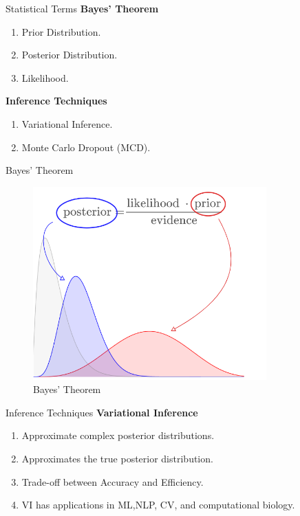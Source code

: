 \documentclass[aspectratio=169,xcolor=dvipsnames, t]{beamer}
\begin{document}
\begin{frame}{Statistical Terms}
    \textbf{Bayes' Theorem}
    \begin{enumerate}
        \item Prior Distribution.
        \item Posterior Distribution.
        \item Likelihood.
    \end{enumerate}
    
    \textbf{Inference Techniques}
    \begin{enumerate}
        \item Variational Inference.
        \item Monte Carlo Dropout (MCD).
    \end{enumerate}
\end{frame}

\begin{frame}{Bayes' Theorem}
    \begin{figure}
        \centering
        \includegraphics[width=0.8\textwidth,height=0.8\textheight,keepaspectratio]{Capture.PNG}
        \caption{Bayes' Theorem}
    \end{figure}
\end{frame}

\begin{frame}{Inference Techniques}
 \textbf{Variational Inference}
     \begin{enumerate}
        \item Approximate complex posterior distributions.
        \item Approximates the true posterior distribution.
        \item Trade-off between Accuracy and Efficiency.
        \item VI has applications in ML,NLP, CV, and computational biology.
    \end{enumerate}
\end{frame}
\end{document}
